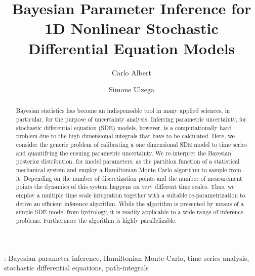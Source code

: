 \documentclass[12pt,a4paper,final]{iopart}
\begin{document}
\title[Parameter inference with stochastic models]{Bayesian Parameter Inference for 1D Nonlinear Stochastic Differential Equation Models}

\author[cor1]{Carlo Albert}%
\address{Eawag, Swiss Federal Institute of Aquatic Science and Technology, 8600 D\"ubendorf, Switzerland}

\author{Simone Ulzega}
\address{Eawag, Swiss Federal Institute of Aquatic Science and Technology, 8600 D\"ubendorf, Switzerland}



\begin{abstract}
Bayesian statistics has become an indispensable tool in many applied sciences, in particular, for the purpose of uncertainty analysis.
Inferring parametric uncertainty, for stochastic differential equation (SDE) models, however, is a computationally hard problem due to the high dimensional integrals that have to be calculated.
Here, we consider the generic problem of calibrating a one dimensional SDE model to time series and quantifying the ensuing parametric uncertainty.
We re-interpret the Bayesian posterior distribution, for model parameters, as the partition function of a statistical mechanical system and employ a Hamiltonian Monte Carlo algorithm to sample from it.
Depending on the number of discretization points and the number of measurement points the dynamics of this system happens on very different time scales.
Thus, we employ a multiple time scale integration together with a suitable re-parametrization to derive an efficient inference algorithm.
While the algorithm is presented by means of a simple SDE model from hydrology, it is readily applicable to a wide range of inference problems. Furthermore the algorithm is highly parallelizable.

\end{abstract}

\vspace{2pc}
: Bayesian parameter inference, Hamiltonian Monte Carlo, time series analysis, stochastic differential equations, path-integrals
\end{document}

